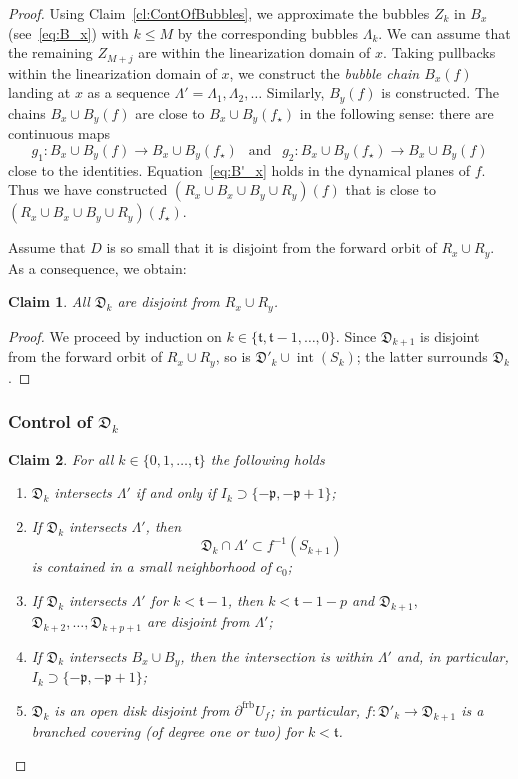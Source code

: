 \documentclass[]{amsart}
\renewcommand{\sp}{{\ \ }}
\newcommand{\bLambda}{{\mathbb{\Lambda}}}
\newcommand\intr{\operatorname{int}}
\newcommand{\str}{{\star}}
\newcommand{\pp}{\mathfrak{p}}
\renewcommand{\tt}{\mathfrak{t}}
\newcommand\frb{{\operatorname{frb}}}
\newtheorem{claim}{Claim}
\theoremstyle{remark}
\numberwithin{equation}{section}
\theoremstyle{definition}
\begin{document}
\begin{proof}
Using Claim~\ref{cl:ContOfBubbles}, we approximate the bubbles $Z_k$ in $B_x$  (see~\eqref{eq:B_x}) with $k\le M$ by the corresponding bubbles $\bLambda_k$. We can assume that the remaining $ Z_{M+j}$ are within the linearization domain of $x$. Taking pullbacks within the linearization domain of $x$, we construct the \emph{bubble chain $B_x(f)$} landing at $x$ as a sequence $\bLambda'=\bLambda_1,\bLambda_2,\dots$  Similarly, $B_y(f)$ is constructed. The chains $B_x\cup B_y(f)$ are close to $B_x\cup B_y(f_\str)$ in the following sense: there are continuous maps \[g_1\colon B_x\cup B_y(f) \to B_x\cup B_y(f_\str) \sp \text{ and }\sp g_2\colon B_x\cup B_y(f_\str) \to B_x\cup B_y(f) \] close to the identities. Equation~\eqref{eq:B'_x} holds in the dynamical planes of $f$. Thus we have constructed $\left(R_x\cup B_x\cup B_y \cup R_y\right)(f)$ that is close to  $\left(R_x\cup B_x\cup B_y \cup R_y\right)(f_\str)$.


Assume that $D$ is so small that it is disjoint from the forward orbit of $R_x\cup R_y$. As a consequence, we obtain: 
\begin{claim}
\label{cl:Separ} All $\mathfrak D_k$ are disjoint from $R_x\cup R_y$.
\end{claim}
\begin{proof}
We proceed by induction on $k\in \{\tt, \tt-1,\dots, 0\}$. Since $\mathfrak D_{k+1}$ is disjoint from the forward orbit of $R_x\cup R_y$, so is $\mathfrak D'_{k}\cup \intr(S_k)$; the latter surrounds $\mathfrak D_k$.
\end{proof}  





\subsubsection{Control of $\mathfrak D_k$}
\begin{claim}
\label{cl:ContrD_k}
 For all $k\in  \{0,1,\dots , \tt \}$ the following holds
\begin{enumerate}
\item $\mathfrak D_{k}$ intersects $\bLambda'$ if and only if $I_k\supset \{-\pp,-\pp+1\}$;
\label{cl:ContrD_k:1}
\item If $\mathfrak D_{k}$ intersects $\bLambda'$, then
\[\mathfrak D_{k}\cap \bLambda' \subset f^{-1}(S_{k+1})\] is contained in a small neighborhood of $c_0$; 
\label{cl:ContrD_k:2}
\item If $\mathfrak D_{k}$ intersects $\bLambda'$ for $k<\tt-1$, then $k<\tt-1-p$ and $\mathfrak D_{k+1},$ $\mathfrak D_{k+2},\dots , \mathfrak D_{k+p+1}$ are disjoint from $\bLambda'$;
\label{cl:ContrD_k:3}
\item  If $\mathfrak D_{k}$ intersects $B_x\cup B_y$, then the intersection is within $\bLambda'$ and, in particular, $I_k\supset \{-\pp,-\pp+1\}$;
\label{cl:ContrD_k:4}
\item $\mathfrak D_{k}$ is an open disk disjoint from $\partial^\frb U_f$; in particular, $f\colon \mathfrak D'_{k}\to \mathfrak D_{k+1}$ is a branched covering (of degree one or two) for $k<\tt$.
\label{cl:ContrD_k:5}
\end{enumerate}
\end{claim}



\end{proof}
\end{document}
